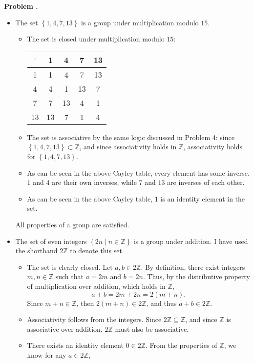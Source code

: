 \documentclass[11pt, letterpaper]{report}
\newcounter{prob}\setcounter{prob}{0}
\renewcommand{\theprob}{\textbf{Problem \arabic{prob}. }}
\newcommand{\problem}{\stepcounter{prob}\noindent\theprob}
\renewenvironment{solution}[1][]{\begin{bwaaa}}{\end{bwaaa}\vspace{10pt}}
\begin{document}
\problem 
\begin{solution}
\begin{itemize}
	\item The set $\left\{ 1,4,7,13 \right\} $ is a group under multiplication modulo $15$.
		\begin{itemize}
			\item The set is closed under multiplication modulo $15 $:
				\begin{center}
					\begin{tabular}{c|cccc}
						$\cdot $ &1&4&7&13\\
						\hline
						1&1&4&7&13\\
						4&4&1&13&7\\
						7&7&13&4&1\\
						13&13&7&1&4
					\end{tabular}
				\end{center}
			\item The set is associative by the same logic discussed in Problem 4: since $\left\{ 1,4,7,13 \right\} \subset \mathbb{Z}$, and since associativity holds in $\mathbb{Z}$, associativity holds for $\left\{ 1,4,7,13 \right\} $.
			\item As can be seen in the above Cayley table, every element has some inverse. $1$ and $4$ are their own inverses, while $7$ and $13$ are inverses of each other.
			\item As can be seen in the above Cayley table, $1$ is an identity element in the set.
		\end{itemize}
		All properties of a group are satisfied.
	\item The set of even integers $\left\{ 2n \mid n\in\mathbb{Z} \right\} $ is a group under addition. I have used the shorthand $2\mathbb{Z}$ to denote this set.
		\begin{itemize}
			\item The set is clearly closed. Let $a,b\in 2\mathbb{Z}$. By definition, there exist integers $m,n\in\mathbb{Z}$ such that $a=2m$ and $b=2n$. Thus, by the distributive property of multiplication over addition, which holds in $\mathbb{Z}$,
				\[
					a+b=2m+2n=2(m+n)
				.\]
				Since $m+n\in\mathbb{Z}$, then $2(m+n)\in 2\mathbb{Z}$, and thus $a+b\in 2\mathbb{Z}$.
			\item Associativity follows from the integers. Since $2\mathbb{Z}\subseteq \mathbb{Z}$, and since $\mathbb{Z}$ is associative over addition, $2\mathbb{Z}$ must also be associative.
			\item There exists an identity element $0\in 2\mathbb{Z}$. From the properties of $\mathbb{Z}$, we know for any $a\in2\mathbb{Z}$,

\end{itemize}
\end{itemize}
\end{solution}
\end{document}
